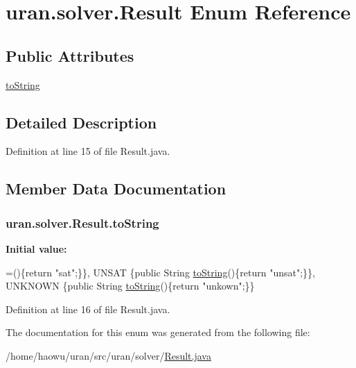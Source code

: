 \hypertarget{enumuran_1_1solver_1_1_result}{}\section{uran.\+solver.\+Result Enum Reference}
\label{enumuran_1_1solver_1_1_result}
\subsection*{Public Attributes}
\begin{DoxyCompactItemize}
\item 
\hyperlink{enumuran_1_1solver_1_1_result_ae60a826562b5a59b39d64833ea6420d8}{to\+String}
\end{DoxyCompactItemize}


\subsection{Detailed Description}


Definition at line 15 of file Result.\+java.



\subsection{Member Data Documentation}
\hypertarget{enumuran_1_1solver_1_1_result_ae60a826562b5a59b39d64833ea6420d8}{}
\subsubsection[{to\+String}]{\setlength{\rightskip}{0pt plus 5cm}uran.\+solver.\+Result.\+to\+String}\label{enumuran_1_1solver_1_1_result_ae60a826562b5a59b39d64833ea6420d8}
{\bfseries Initial value\+:}
\begin{DoxyCode}
=()\{\textcolor{keywordflow}{return} \textcolor{stringliteral}{"sat"};\}\},
    UNSAT \{\textcolor{keyword}{public} String \hyperlink{enumuran_1_1solver_1_1_result_ae60a826562b5a59b39d64833ea6420d8}{toString}()\{\textcolor{keywordflow}{return} \textcolor{stringliteral}{"unsat"};\}\},
    UNKNOWN \{\textcolor{keyword}{public} String \hyperlink{enumuran_1_1solver_1_1_result_ae60a826562b5a59b39d64833ea6420d8}{toString}()\{\textcolor{keywordflow}{return} \textcolor{stringliteral}{"unkown"};\}\}
\end{DoxyCode}


Definition at line 16 of file Result.\+java.



The documentation for this enum was generated from the following file\+:\begin{DoxyCompactItemize}
\item 
/home/haowu/uran/src/uran/solver/\hyperlink{_result_8java}{Result.\+java}\end{DoxyCompactItemize}
